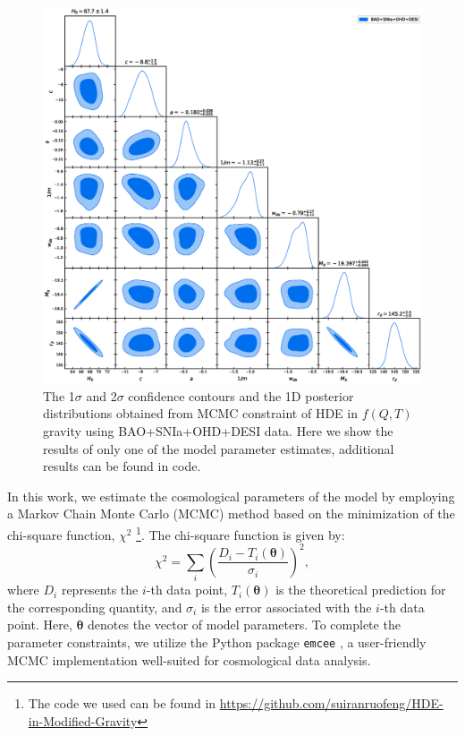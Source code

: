 \documentclass[a4paper,fleqn]{cas-sc}
\begin{document}
\begin{figure}
    \centering
    \includegraphics[width=1\linewidth]{./pic/getdist.eps}
    \caption{\label{Fig:constraint} The 1$\sigma$ and 2$\sigma$ confidence contours and the 1D posterior distributions obtained from MCMC constraint of HDE in $f(Q,T)$ gravity using BAO+SNIa+OHD+DESI data. Here we show the results of only one of the model parameter estimates, additional results can be found in code.}
\end{figure}

In this work, we estimate the cosmological parameters of the model by employing a Markov Chain Monte Carlo (MCMC) method based on the minimization of the chi-square function, $\chi^2$ \cite{Padilla_2021}\footnote{The code we used can be found in \url{https://github.com/suiranruofeng/HDE-in-Modified-Gravity}}. The chi-square function is given by:
\begin{equation}
\chi^2 = \sum_i \left(\frac{D_i - T_i(\mathbf{\theta})}{\sigma_i}\right)^2,
\end{equation}
where $D_i$ represents the $i$-th data point, $T_i(\mathbf{\theta})$ is the theoretical prediction for the corresponding quantity, and $\sigma_i$ is the error associated with the $i$-th data point. Here, $\mathbf{\theta}$ denotes the vector of model parameters. To complete the parameter constraints, we utilize the Python package \texttt{emcee} \cite{emcee}, a user-friendly MCMC implementation well-suited for cosmological data analysis.
\end{document}
